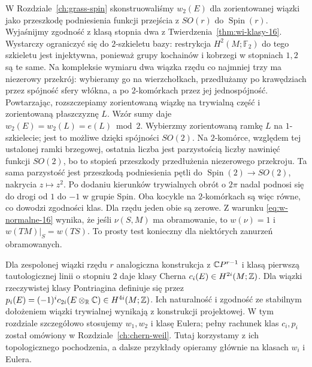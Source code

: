 \begin{uwaga}
W Rozdziale~\ref{ch:grass-spin}
skonstruowaliśmy
$w_2(E)$ dla zorientowanej
wiązki jako przeszkodę
podniesienia funkcji
przejścia z $SO(r)$
do $\operatorname{Spin}(r)$.
Wyjaśnijmy zgodność z klasą stopnia dwa z
Twierdzenia~\ref{thm:wi-klasy-16}. Wystarczy ograniczyć
się do $2$-szkieletu bazy: restrykcja $H^2(M;\mathbb F_2)$
do tego szkieletu jest injektywna, ponieważ grupy
kochainów i kobrzegi w stopniach $1,2$ są te same.
Na kompleksie wymiaru dwa wiązka rzędu co najmniej trzy
ma niezerowy przekrój: wybieramy go na wierzchołkach,
przedłużamy po krawędziach przez spójność sfery włókna,
a po $2$-komórkach przez jej jednospójność.
Powtarzając, rozszczepiamy zorientowaną wiązkę na
trywialną część i zorientowaną płaszczyznę $L$.
Wzór sumy daje $w_2(E)=w_2(L)=e(L)\bmod2$.
Wybierzmy zorientowaną ramkę $L$ na $1$-szkielecie;
jest to możliwe dzięki spójności $SO(2)$.
Na $2$-komórce, względem tej ustalonej ramki brzegowej,
ostatnia liczba jest parzystością liczby nawinięć
funkcji $SO(2)$, bo to
stopień przeszkody przedłużenia niezerowego przekroju.
Ta sama parzystość jest przeszkodą podniesienia pętli
do $\operatorname{Spin}(2)\to SO(2)$, nakrycia $z\mapsto z^2$.
Po dodaniu kierunków trywialnych obrót o $2\pi$
nadal podnosi się do drogi od $1$ do $-1$ w grupie Spin.
Oba kocykle na $2$-komórkach są więc równe,
co dowodzi zgodności klas. Dla rzędu jeden obie są zerowe.
Z warunku
\eqref{eq:w-normalne-16}
wynika, że jeśli
$\nu(S,M)$ ma obramowanie,
to $w(\nu)=1$ i
$w(TM)|_S=w(TS)$.
To prosty test konieczny
dla niektórych zanurzeń
obramowanych.
\end{uwaga}

\begin{uwaga}
Dla zespolonej wiązki
rzędu $r$ analogiczna
konstrukcja z
$\mathbb{C} P^{r-1}$
i klasą pierwszą
tautologicznej linii
o stopniu $2$
daje klasy Cherna
$c_i(E)\in H^{2i}(M;\mathbb{Z})$.
Dla wiązki rzeczywistej
klasy Pontriagina
definiuje się przez
$p_i(E)=(-1)^i
c_{2i}(E\otimes_{\mathbb{R}}\mathbb{C})
\in H^{4i}(M;\mathbb{Z})$.
Ich naturalność i
zgodność ze stabilnym
dołożeniem wiązki
trywialnej wynikają
z konstrukcji projektowej.
W tym rozdziale
szczegółowo stosujemy
$w_1,w_2$ i klasę
Eulera; pełny rachunek
klas $c_i,p_i$
został omówiony w Rozdziale~\ref{ch:chern-weil}.
Tutaj korzystamy z ich topologicznego pochodzenia,
a dalsze przykłady opieramy głównie na klasach $w_i$ i Eulera.
\end{uwaga}


